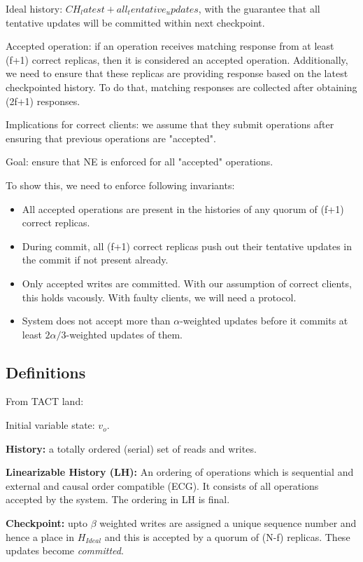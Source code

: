 \documentclass[letterpaper,twocolumn,10pt]{article}
\begin{document}
Ideal history: $CH_latest + all_tentative_updates$, with the guarantee
that all tentative updates will be committed within next checkpoint.

Accepted operation: if an operation receives matching response from at least
(f+1) correct replicas, then it is considered an accepted operation. 
Additionally, we need to ensure that these replicas are providing response
based on the latest checkpointed history. To do that, matching responses
are collected after obtaining (2f+1) responses. 

Implications for correct clients: we assume that they submit operations
after ensuring that previous operations are "accepted".

Goal: ensure that NE is enforced for all "accepted" operations.

To show this, we need to enforce following invariants:
\begin{itemize}
\item{} All accepted operations are present in the histories of any quorum of
(f+1) correct replicas.
\item{} During commit, all (f+1) correct replicas push out their tentative
updates in the commit if not present already.
\item{} Only accepted writes are committed. With our assumption of correct
clients, this holds vacously. With faulty clients, we will need a protocol.
\item{} System does not accept more than $\alpha$-weighted updates before it
commits at least $2\alpha/3$-weighted updates of them.
\end{itemize}


\subsection{Definitions}
From TACT land:



Initial variable state: $v_{o}$.

\textbf{History:} a totally ordered (serial) set of reads and writes.

\textbf{Linearizable History (LH):} An ordering of operations which is 
sequential and external and causal order compatible (ECG). It
consists of all operations accepted by the system. The ordering
in LH is final.

\textbf{Checkpoint:} upto $\beta$ weighted writes are assigned a unique
sequence number and hence a place in $H_{Ideal}$
and this is accepted by a quorum of (N-f) replicas. These updates
become \textit{committed}.
\end{document}
